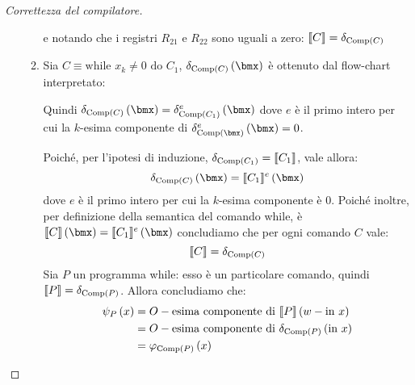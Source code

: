 \documentclass{lectures}
\begin{document}
\begin{proof}[Correttezza del compilatore]
\begin{enumerate}
\begin{enumerate}
            e notando che i registri \(R_{21}\) e \(R_{22}\) sono uguali a zero: \(\llbracket C\rrbracket = \delta_{\text{Comp}\left(C\right)}\)
            \item \begin{multicols}{2}
                Sia \(C \equiv \text{while }x_k\neq 0\text{ do }C_1\), \(\delta_{\text{Comp}\rnd{C}}\rnd{\bmx}\) è ottenuto dal flow-chart interpretato:
                \vspace{1em}
                \begin{figure}
                \end{figure}
                Quindi \(\delta_{\text{Comp}\rnd{C}}\rnd{\bmx} = \delta^e_{\text{Comp}\rnd{C_1}}\rnd{\bmx}\) dove \(e\) è il primo intero per cui la \(k\)-esima componente di \(\delta^e_{\text{Comp}\rnd{\bmx}}\rnd{\bmx} = 0\).
                
                Poiché, per l'ipotesi di induzione, \(\delta_{\text{Comp}\left(C_1\right)}=\llbracket C_1\rrbracket\), vale allora:
                \[
                    \delta_{\text{Comp}\rnd{C}}\rnd{\bmx}=\ssqr{C_1}^e\rnd{\bmx}
                \]
                dove \(e\) è il primo intero per cui la \(k\)-esima componente è \(0\). Poiché inoltre, per definizione della semantica del comando while, è \(\ssqr{C}\rnd{\bmx} = \ssqr{C_1}^e\rnd{\bmx}\) concludiamo che per ogni comando \(C\) vale:
                \[
                    \llbracket C\rrbracket = \delta_{\text{Comp}\left(C\right)}
                \]
                Sia \(P\) un programma while: esso è un particolare comando, quindi \(\llbracket P\rrbracket = \delta_{\text{Comp}\left(P\right)}\). Allora concludiamo che:
                \begin{align*}
                    \psi_P\left(x\right) &= O-\text{esima componente di }\llbracket P\rrbracket\left(w-\text{in }x\right)\\
                    &= O-\text{esima componente di }\delta_{\text{Comp}\left(P\right)}\left(\text{in }x\right)\\
                    &=\varphi_{\text{Comp}\left(P\right)}\left(x\right)
                \end{align*}
            \end{multicols}
        \end{enumerate}
    \end{enumerate}
\end{proof}
\end{document}
